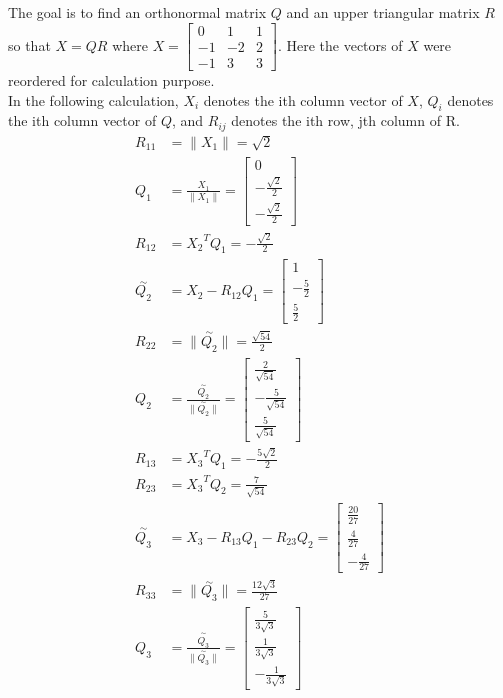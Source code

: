 \documentclass{article}
\begin{document}
\subsection{}
The goal is to find an orthonormal matrix $Q$ and an upper triangular matrix $R$ so that $X=QR$ where $X=\begin{bmatrix}
0 & 1 & 1 \\
-1 & -2 & 2 \\
-1 & 3 & 3
\end{bmatrix}$. Here the vectors of $X$ were reordered for calculation purpose.\\
In the following calculation, $X_i$ denotes the ith column vector of $X$, $Q_i$ denotes the ith column vector of $Q$, and $R_{ij}$ denotes the ith row, jth column of R. \\
\begin{align*}
R_{11} &= \|{X_1}\| = \sqrt{2} \\
Q_1 &= \frac{X_1}{\|{X_1}\|} = \begin{bmatrix}0 \\ -\frac{\sqrt{2}}{2} \\[0.5em] -\frac{\sqrt{2}}{2}\end{bmatrix} \\
R_{12} &= {X_2}^T Q_1 = -\frac{\sqrt{2}}{2} \\
\overset{\sim}{Q_2} &= X_2 - R_{12}Q_1 = \begin{bmatrix}1 \\ -\frac{5}{2} \\[0.5em] \frac{5}{2}\end{bmatrix} \\
R_{22} &= \|\overset{\sim}{Q_2}\| = \frac{\sqrt{54}}{2} \\
Q_2 &= \frac{\overset{\sim}{Q_2}}{\|{\overset{\sim}{Q_2}}\|} = \begin{bmatrix}\frac{2}{\sqrt{54}} \\[0.5em] -\frac{5}{\sqrt{54}} \\[0.5em] \frac{5}{\sqrt{54}}\end{bmatrix} \\
R_{13} &= {X_3}^T Q_1 = -\frac{5\sqrt{2}}{2} \\
R_{23} &= {X_3}^T Q_2 = \frac{7}{\sqrt{54}} \\
\overset{\sim}{Q_3} &= X_3 - R_{13}Q_1 - R_{23}Q_2 = \begin{bmatrix}\frac{20}{27} \\[0.5em] \frac{4}{27} \\[0.5em] -\frac{4}{27}\end{bmatrix} \\
R_{33} &= \|\overset{\sim}{Q_3}\| = \frac{12\sqrt{3}}{27} \\
Q_3 &= \frac{\overset{\sim}{Q_3}}{\|{\overset{\sim}{Q_3}}\|} = \begin{bmatrix}\frac{5}{3\sqrt{3}} \\[0.5em] \frac{1}{3\sqrt{3}} \\[0.5em] -\frac{1}{3\sqrt{3}}\end{bmatrix}
\end{align*}
\end{document}
